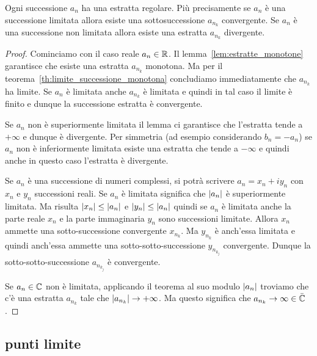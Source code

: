 \begin{theorem}\label{th:Bolzano}
\label{th:bolzano_weierstrass}%
\mymark{***}%
%
%
%
Ogni successione $a_n$ ha una estratta regolare.
Più precisamente se $a_n$ è una successione limitata
allora esiste una sottosuccessione
$a_{n_k}$ convergente.
Se $a_n$ è una successione non limitata allora 
esiste una estratta $a_{n_k}$ divergente.
\end{theorem}
%
\begin{proof}
\mymark{***}
Cominciamo con il caso reale $a_n\in {\mathbb R}$.
Il lemma~\ref{lem:estratte_monotone} garantisce 
che esiste una estratta $a_{n_k}$ monotona. 
Ma per il teorema~\ref{th:limite_successione_monotona} concludiamo 
immediatamente che $a_{n_k}$ ha limite.
Se $a_n$ è limitata anche $a_{n_k}$ è limitata e quindi 
in tal caso il limite è finito e dunque la successione 
estratta è convergente.

Se $a_n$ non è superiormente limitata il lemma 
ci garantisce che l'estratta tende a $+\infty$ 
e dunque è divergente.
Per simmetria (ad esempio considerando $b_n=-a_n$) se $a_n$ non è inferiormente limitata 
esiste una estratta che tende a $-\infty$ e quindi anche in
questo caso l'estratta è divergente.

Se $a_n$ è una successione di numeri complessi, si potrà scrivere
$a_n = x_n + i y_n$ con
$x_n$ e $y_n$ successioni reali. Se $a_n$ è limitata significa che ${\left|a_n\right|}$
è superiormente limitata. Ma risulta ${\left|x_n\right|} \le {\left|a_n\right|}$ e
${\left|y_n\right|}\le {\left|a_n\right|}$ quindi se $a_n$ è limitata anche la parte reale
$x_n$ e la parte immaginaria $y_n$ sono successioni limitate.
Allora $x_n$ ammette una sotto-successione convergente $x_{n_k}$.
Ma $y_{n_k}$ è anch'essa limitata e quindi anch'essa ammette una
sotto-sotto-successione $y_{n_{k_j}}$ convergente.
Dunque la sotto-sotto-successione $a_{n_{k_j}}$ è convergente.

Se $a_n\in {\mathbb C}$ non è limitata, applicando il teorema al suo modulo ${\left|a_n\right|}$
troviamo che c'è una estratta $a_{n_k}$ tale che ${\left|a_{n_k}\right|}\to +\infty$.
Ma questo significa che $a_{n_k}\to \infty \in \bar {{\mathbb C}}$.
\end{proof}

\subsection{punti limite}

